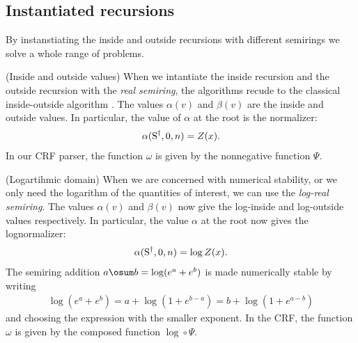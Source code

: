 
\subsection{Instantiated recursions}

By instanstiating the inside and outside recursions with different semirings we solve a whole range of problems.

\begin{example}{(Inside and outside values)}
  When we intantiate the inside recursion and the outside recursion with the \textit{real semiring}, the algorithms recude to the classical inside-outside algorithm \citep{baker1979trainable}. The values $\alpha(v)$ and $\beta(v)$ are the inside and outside values. In particular, the value of $\alpha$ at the root is the normalizer:
  \begin{align*}
    \alpha(\text{S}^{\dagger}, 0, n) = Z(x).
  \end{align*}
  In our CRF parser, the function $\omega$ is given by the nonnegative function $\Psi$.
\end{example}

\begin{example}{(Logartihmic domain)}
  When we are concerned with numerical stability, or we only need the logarithm of the quantities of interest, we can use the \textit{log-real semiring}. The values $\alpha(v)$ and $\beta(v)$ now give the log-inside and log-outside values respectively. In particular, the value $\alpha$ at the root now gives the lognormalizer:
  \begin{align*}
    \alpha(\text{S}^{\dagger}, 0, n) = \log Z(x).
  \end{align*}
  The semiring addition $a \osum b = \log(e^{a} + e^{b})$ is made numerically stable by writing
  \begin{align*}
    \log(e^{a} + e^{b}) = a + \log(1 + e^{b-a}) = b + \log(1 + e^{a-b})
  \end{align*}
  and choosing the expression with the smaller exponent. In the CRF, the function $\omega$ is given by the composed function $\log \circ \Psi$.
\end{example}

